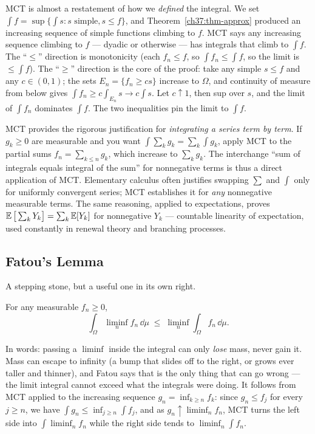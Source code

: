 \begin{whybox}
MCT is almost a restatement of how we \emph{defined} the integral. We set
$\int f = \sup\{\int s : s \text{ simple}, s\le f\}$, and
Theorem~\ref{ch37:thm-approx} produced an increasing sequence of simple
functions climbing to $f$. MCT says any increasing sequence climbing to $f$ ---
dyadic or otherwise --- has integrals that climb to $\int f$. The
``$\le$'' direction is monotonicity (each $f_n\le f$, so $\int f_n\le\int f$,
so the limit is $\le\int f$). The ``$\ge$'' direction is the core of the proof: take any
simple $s\le f$ and any $c\in(0,1)$; the sets $E_n=\{f_n\ge cs\}$ increase to
$\Omega$, and continuity of measure from below gives $\int f_n \ge c\int_{E_n} s
\to c\int s$. Let $c\uparrow 1$, then sup over $s$, and the limit of $\int f_n$
dominates $\int f$. The two inequalities pin the limit to $\int f$.
\end{whybox}

\begin{connectionbox}
MCT provides the rigorous justification for \emph{integrating a series term by term}.
If $g_k\ge 0$ are measurable and you
want $\int \sum_k g_k = \sum_k \int g_k$, apply MCT to the partial sums
$f_n=\sum_{k\le n} g_k$, which increase to $\sum_k g_k$. The interchange
``sum of integrals equals integral of the sum'' for nonnegative
terms is thus a direct application of MCT. Elementary calculus often justifies
swapping $\sum$ and $\int$ only for uniformly convergent series; MCT establishes
it for \emph{any} nonnegative measurable terms. The same reasoning, applied
to expectations, proves $\operatorname{\mathbb{E}}\big[\sum_k Y_k\big]=\sum_k \operatorname{\mathbb{E}}[Y_k]$ for nonnegative
$Y_k$ --- countable linearity of expectation, used constantly in renewal theory
and branching processes.
\end{connectionbox}

\subsection{Fatou's Lemma}

A stepping stone, but a useful one in its own right.

\begin{lemma}[Fatou]
\label{ch37:thm-fatou}
For any measurable $f_n\ge 0$,
\[
  \int_\Omega \liminf_{n} f_n \,\dd\mu \;\le\; \liminf_{n} \int_\Omega
  f_n\,\dd\mu .
\]
\end{lemma}

In words: passing a $\liminf$ inside the integral can only \emph{lose} mass,
never gain it. Mass can escape to infinity (a bump that slides off to the right,
or grows ever taller and thinner), and Fatou says that is the only thing that
can go wrong --- the limit integral cannot exceed what the integrals were doing.
It follows from MCT applied to the increasing sequence $g_n=\inf_{k\ge n}f_k$: since
$g_n \le f_j$ for every $j \ge n$, we have $\int g_n \le \inf_{j \ge n}\int f_j$, and as
$g_n \uparrow \liminf_n f_n$, MCT turns the left side into $\int \liminf_n f_n$ while the right
side tends to $\liminf_n \int f_n$.

